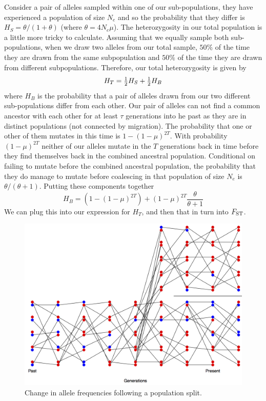 Consider a pair of alleles sampled within one of our
sub-populations, they have experienced a population of size $N_e$
and so the probability that they differ is $H_S = \theta/(1+\theta)$
(where $\theta=4N_e\mu$).
The heterozygosity in our total population is a little more tricky to
calculate. Assuming that we equally sample both sub-populations, when we draw two alleles from our total
sample, $50\%$ of the time they are drawn from the same
subpopulation and $50\%$ of the time they are drawn from different
subpopulations. Therefore, our total heterozygosity is given by
\begin{equation}
H_T = \tfrac{1}{2} H_S + \tfrac{1}{2} H_B
\end{equation}
where $H_B$ is the probability that a pair of alleles drawn from our
two different sub-populations differ from each other. Our pair of
alleles can not find a common ancestor with each other for at least $\tau$
generations into he past as they are in distinct populations (not
connected by migration). The probability that one or other of them
mutates in this time is $1-(1-\mu)^{2T}$. With probability
$(1-\mu)^{2T} $ neither of our alleles mutate in the $T$ generations
back in time before they find themselves back in the combined ancestral 
population. Conditional on failing to mutate before the combined ancestral
population, the probability that they do manage to mutate before
coalescing in that population of size $N_e$ is
$\theta/(\theta+1)$. Putting these components together
\begin{equation}
H_B = \left( 1-(1-\mu)^{2T} \right) + (1-\mu)^{2T}
  \frac{\theta}{\theta+1} 
\end{equation}
We can plug this into our expression for $H_T$, and then that in turn
into $F_{\mathrm{ST}}$.

\begin{figure}
\begin{center}
\includegraphics[width= 0.8 \textwidth]{figures/drift_split.png}
\end{center}
\caption{Change in allele frequencies following a population split.} \label{fig:drift_split}  
\end{figure} 

